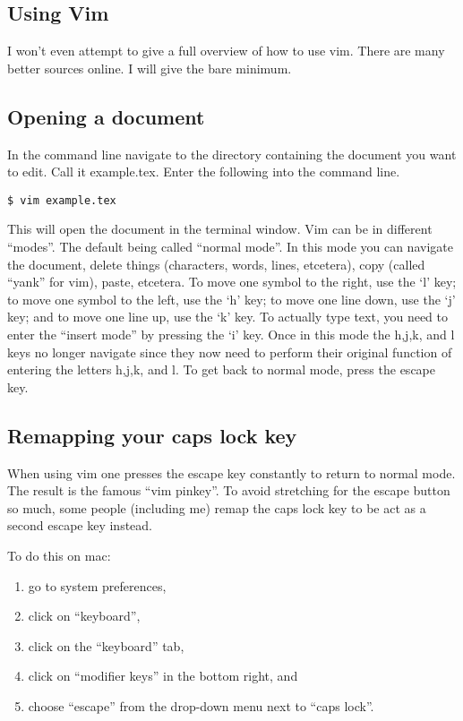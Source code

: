 \documentclass{amsart}
\begin{document}
\subsection{Using Vim}

I won't even attempt to give a full overview of how to use vim. There are many better
sources online. 
I will give the bare minimum. 

\subsection{Opening a document}

In the command line navigate to the directory containing the document you want to edit.
Call it example.tex. Enter the following into the command line.
\begin{center}
\begin{verbatim}
$ vim example.tex
\end{verbatim}
\end{center}
This will open the document in the terminal window. Vim can be in different 
``modes''. The default being called ``normal mode''. In this mode you can navigate the
document, delete things (characters, words, lines, etcetera), copy (called ``yank'' for vim),
paste, etcetera. To move one symbol to the right, use the `l' key; to move one symbol to
the left, use the `h' key; to move one line down, use the `j' key; and to move one line
up, use the `k' key. To actually type text, you need to enter the 
``insert mode'' by pressing the `i' key. Once in this mode the h,j,k, and l keys no longer
navigate since they now need to perform their original function of entering the letters
h,j,k, and l. To get back to normal mode, press the escape key. 

\subsection{Remapping your caps lock key}

When using vim one presses the escape key constantly to return to normal mode. The result
is the famous ``vim pinkey''. To avoid stretching for the escape button so much, some
people (including me) remap the caps lock key to be act as a second escape key instead. 

To do this on mac:
\begin{enumerate}
\item go to system preferences,
\item click on ``keyboard'', 
\item click on the ``keyboard'' tab, 
\item click on ``modifier keys'' in the bottom right, and
\item choose ``escape'' from the drop-down menu next to ``caps lock''.
\end{enumerate}
\end{document}

